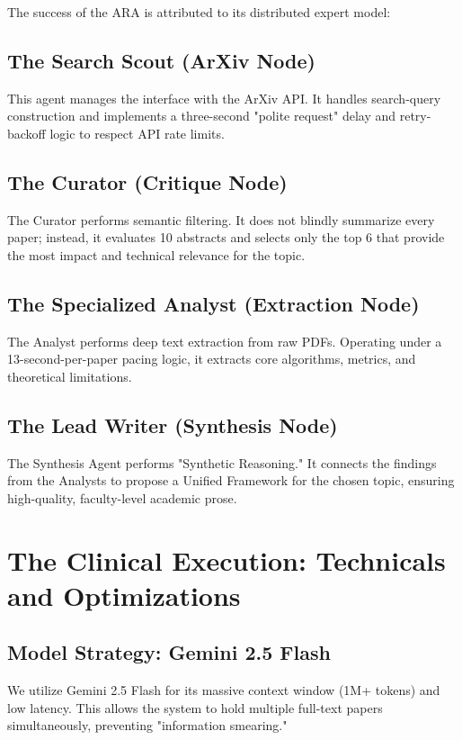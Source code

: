 \documentclass[11pt,a4paper]{article}
\begin{document}
The success of the ARA is attributed to its distributed expert model:

\subsection{The Search Scout (ArXiv Node)}
This agent manages the interface with the ArXiv API. It handles search-query construction and implements a three-second "polite request" delay and retry-backoff logic to respect API rate limits.

\subsection{The Curator (Critique Node)}
The Curator performs semantic filtering. It does not blindly summarize every paper; instead, it evaluates 10 abstracts and selects only the top 6 that provide the most impact and technical relevance for the topic.

\subsection{The Specialized Analyst (Extraction Node)}
The Analyst performs deep text extraction from raw PDFs. Operating under a 13-second-per-paper pacing logic, it extracts core algorithms, metrics, and theoretical limitations.

\subsection{The Lead Writer (Synthesis Node)}
The Synthesis Agent performs "Synthetic Reasoning." It connects the findings from the Analysts to propose a Unified Framework for the chosen topic, ensuring high-quality, faculty-level academic prose.

\section{The Clinical Execution: Technicals and Optimizations}

\subsection{Model Strategy: Gemini 2.5 Flash}
We utilize Gemini 2.5 Flash for its massive context window (1M+ tokens) and low latency. This allows the system to hold multiple full-text papers simultaneously, preventing "information smearing."
\end{document}
